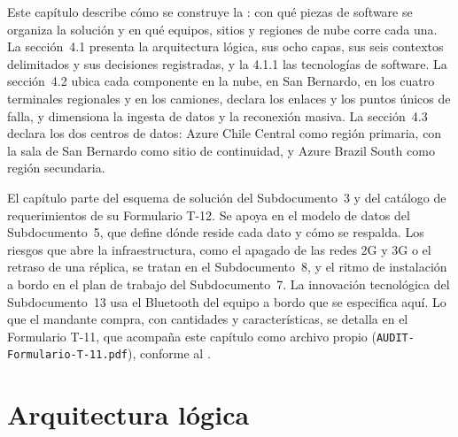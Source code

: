 %

Este capítulo describe cómo se construye la : con qué piezas de software se organiza
la solución y en qué equipos, sitios y regiones de nube corre cada una. La sección~4.1 presenta la
arquitectura lógica, sus ocho capas, sus seis contextos delimitados y sus decisiones registradas, y la
4.1.1 las tecnologías de software. La sección~4.2 ubica cada componente en la nube, en San Bernardo,
en los cuatro terminales regionales y en los camiones, declara los enlaces y los puntos únicos de
falla, y dimensiona la ingesta de datos y la reconexión masiva. La sección~4.3 declara los dos
centros de datos: Azure Chile Central como región primaria, con la sala de San Bernardo como sitio de
continuidad, y Azure Brazil South como región secundaria.

El capítulo parte del esquema de solución del Subdocumento~3 y del catálogo de requerimientos de su
Formulario T-12. Se apoya en el modelo de datos del Subdocumento~5, que define dónde reside cada dato
y cómo se respalda. Los riesgos que abre la infraestructura, como el apagado de las redes 2G y 3G o el
retraso de una réplica, se tratan en el Subdocumento~8, y el ritmo de instalación a bordo en el plan
de trabajo del Subdocumento~7. La innovación tecnológica del Subdocumento~13 usa el Bluetooth del
equipo a bordo que se especifica aquí. Lo que el mandante compra, con cantidades y características, se
detalla en el Formulario T-11, que acompaña este capítulo como archivo propio
(\texttt{AUDIT-Formulario-T-11.pdf}), conforme al .

\section{Arquitectura lógica}\label{sec:4-logica}

